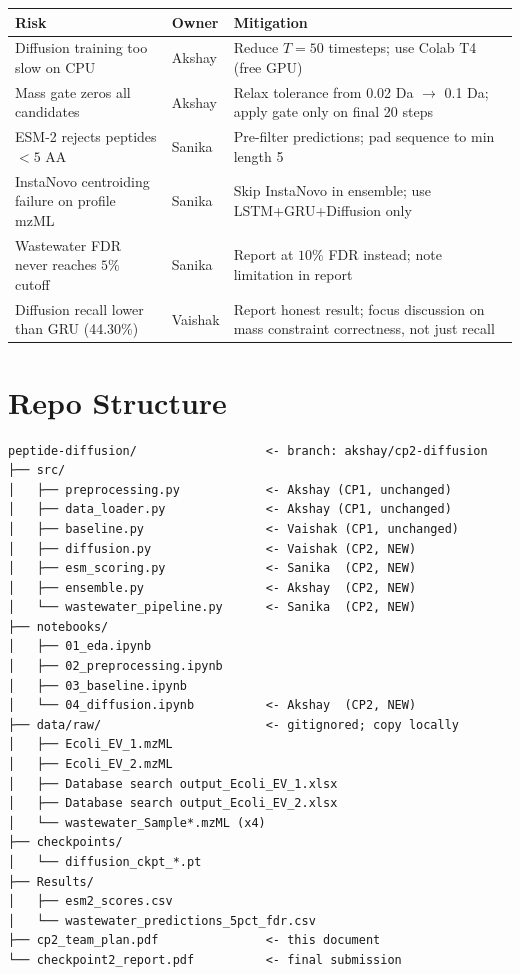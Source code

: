 \documentclass[11pt,letterpaper]{article}
\begin{document}
\begin{center}
\begin{tabular}{p{3.5cm} p{1.8cm} p{6cm}}
\toprule
\textbf{Risk} & \textbf{Owner} & \textbf{Mitigation} \\
\midrule
Diffusion training too slow on CPU &
  Akshay &
  Reduce $T = 50$ timesteps; use Colab T4 (free GPU) \\
\addlinespace
Mass gate zeros all candidates &
  Akshay &
  Relax tolerance from 0.02 Da $\rightarrow$ 0.1 Da; apply gate only on final 20 steps \\
\addlinespace
ESM-2 rejects peptides $< 5$ AA &
  Sanika &
  Pre-filter predictions; pad sequence to min length 5 \\
\addlinespace
InstaNovo centroiding failure on profile mzML &
  Sanika &
  Skip InstaNovo in ensemble; use LSTM+GRU+Diffusion only \\
\addlinespace
Wastewater FDR never reaches $5\%$ cutoff &
  Sanika &
  Report at $10\%$ FDR instead; note limitation in report \\
\addlinespace
Diffusion recall lower than GRU (44.30\%) &
  Vaishak &
  Report honest result; focus discussion on mass constraint correctness, not just recall \\
\bottomrule
\end{tabular}
\end{center}

\section{Repo Structure}

\begin{verbatim}
peptide-diffusion/                  <- branch: akshay/cp2-diffusion
├── src/
│   ├── preprocessing.py            <- Akshay (CP1, unchanged)
│   ├── data_loader.py              <- Akshay (CP1, unchanged)
│   ├── baseline.py                 <- Vaishak (CP1, unchanged)
│   ├── diffusion.py                <- Vaishak (CP2, NEW)
│   ├── esm_scoring.py              <- Sanika  (CP2, NEW)
│   ├── ensemble.py                 <- Akshay  (CP2, NEW)
│   └── wastewater_pipeline.py      <- Sanika  (CP2, NEW)
├── notebooks/
│   ├── 01_eda.ipynb
│   ├── 02_preprocessing.ipynb
│   ├── 03_baseline.ipynb
│   └── 04_diffusion.ipynb          <- Akshay  (CP2, NEW)
├── data/raw/                       <- gitignored; copy locally
│   ├── Ecoli_EV_1.mzML
│   ├── Ecoli_EV_2.mzML
│   ├── Database search output_Ecoli_EV_1.xlsx
│   ├── Database search output_Ecoli_EV_2.xlsx
│   └── wastewater_Sample*.mzML (x4)
├── checkpoints/
│   └── diffusion_ckpt_*.pt
├── Results/
│   ├── esm2_scores.csv
│   └── wastewater_predictions_5pct_fdr.csv
├── cp2_team_plan.pdf               <- this document
└── checkpoint2_report.pdf          <- final submission
\end{verbatim}
\end{document}
